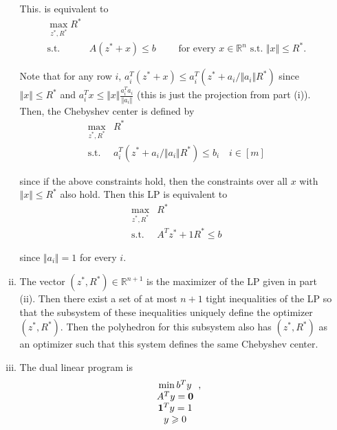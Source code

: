 \documentclass[11pt]{article}
\newcommand{\setR}{\mathbb{R}}
\renewcommand{\leq}{\leqslant}
\renewcommand{\geq}{\geqslant}
\begin{document}
\begin{enumerate}[1)]
\begin{solution}
\begin{enumerate}[i)]
This. is equivalent to 
\begin{align*}
\max_{z^\ast, R^\ast}  R^\ast &\\
\text{s.t. } & A(z^\ast + x) \leq b \quad \quad \text{ for every } x \in \setR^n \text{ s.t. } \Vert x\Vert \leq R^\ast.
\end{align*}

Note that for any row $i$, $a_i^T(z^\ast + x) \leq a_i^T(z^\ast + a_i / \Vert a_i \Vert R^\ast)$ since $\Vert x \Vert \leq R^\ast$ and $a_i^T x \leq \Vert x\Vert \frac{a_i^Ta_i}{\Vert a_i \Vert}$ (this is just the projection from part (i)). Then, the Chebyshev center is defined by 
\begin{align*}
\max_{z^\ast, R^\ast} & R^\ast \\
\text{s.t. } &  a_i^T(z^\ast + a_i / \Vert a_i \Vert R^\ast) \leq b_i \quad i \in [m]
\end{align*} 


since if the above constraints hold, then the constraints over all $x$ with $\Vert x\Vert \leq R^\ast$ also hold. Then this LP is equivalent to 
\begin{align*}
\max_{z^\ast, R^\ast} & R^\ast \\
\text{s.t. } & A^Tz^\ast + 1 R^\ast \leq b
\end{align*}

since $\Vert a_i \Vert = 1$ for every $i$. 

\item The vector $(z^\ast, R^\ast) \in \setR^{n+1}$ is the maximizer of the LP given in part (ii). Then there exist a set of at most $n+1$ tight inequalities of the LP so that the subsystem of these inequalities uniquely define the optimizer $(z^\ast, R^\ast)$. Then the polyhedron for this subsystem also has $(z^\ast, R^\ast)$ as an optimizer such that this system defines the same Chebyshev center. 

\item The dual linear program is 
\begin{displaymath}
  \begin{array}[t]{c}
    \min b^Ty \\
        A^T y = \mathbf{0}\\
        \mathbf{1}^T y = 1\\
        y\geq 0
  \end{array},
\end{displaymath}

  \end{enumerate}
  \end{solution}


\end{enumerate}
\end{document}
